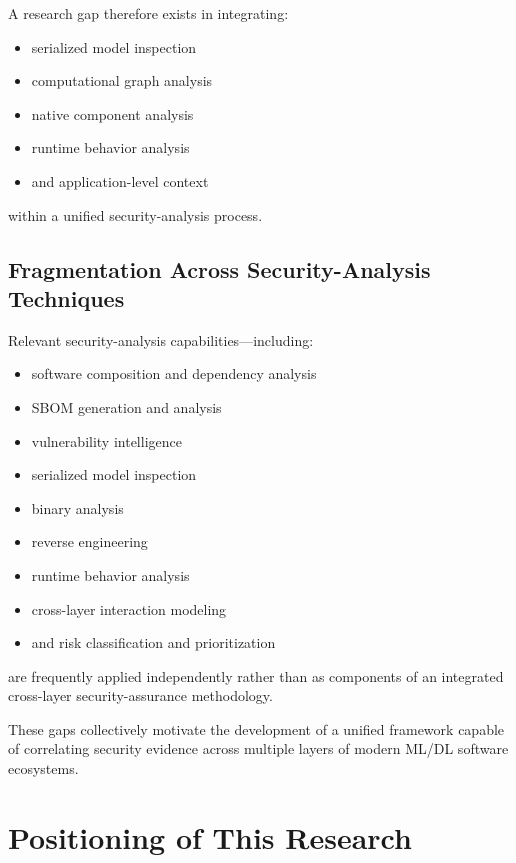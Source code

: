 \documentclass[
  12pt,
  letterpaper,
  oneside]{report}
\providecommand{\tightlist}{%
  \setlength{\itemsep}{0pt}\setlength{\parskip}{0pt}}
\begin{document}
A research gap therefore exists in integrating:

\begin{itemize}
\tightlist
\item
  serialized model inspection
\item
  computational graph analysis
\item
  native component analysis
\item
  runtime behavior analysis
\item
  and application-level context
\end{itemize}

within a unified security-analysis process.

\subsection{Fragmentation Across Security-Analysis Techniques}\label{5-fragmentation-across-security-analysis-techniques}

Relevant security-analysis capabilities---including:

\begin{itemize}
\tightlist
\item
  software composition and dependency analysis
\item
  SBOM generation and analysis
\item
  vulnerability intelligence
\item
  serialized model inspection
\item
  binary analysis
\item
  reverse engineering
\item
  runtime behavior analysis
\item
  cross-layer interaction modeling
\item
  and risk classification and prioritization
\end{itemize}

are frequently applied independently rather than as components of an
integrated cross-layer security-assurance methodology.

These gaps collectively motivate the development of a unified framework
capable of correlating security evidence across multiple layers of
modern ML/DL software ecosystems.

\section{Positioning of This Research}\label{810-positioning-of-this-research}
\end{document}
